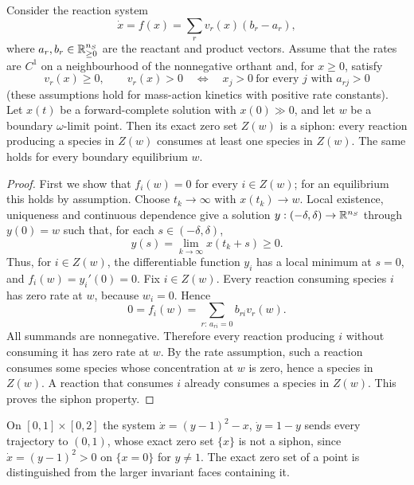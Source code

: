 \label{p:AdLS}
Consider the reaction system
\[
\dot x=f(x)=\sum_r v_r(x)(b_r-a_r),
\]
where $a_r,b_r\in\mathbb{R}_{\ge0}^{n_S}$ are the reactant and product vectors. Assume that the rates are $C^1$
on a neighbourhood of the nonnegative orthant and, for $x\ge0$, satisfy
\[
v_r(x)\ge0,\qquad
v_r(x)>0
\quad\Longleftrightarrow\quad
x_j>0\ \text{for every }j\text{ with }a_{rj}>0
\]
(these assumptions hold for mass-action kinetics with positive rate constants). Let $x(t)$ be a
forward-complete solution with $x(0)\gg0$, and let $w$ be a boundary $\omega$-limit point. Then
its exact zero set $Z(w)$ is a siphon: every reaction producing a species in $Z(w)$ consumes at
least one species in $Z(w)$. The same holds for every boundary equilibrium $w$.
\eeP
\begin{proof}
First we show that $f_i(w)=0$ for every $i\in Z(w)$; for an equilibrium this holds by assumption.
Choose $t_k\to\infty$ with $x(t_k)\to w$. Local existence, uniqueness and continuous dependence
give a solution $y:(-\delta,\delta)\to\mathbb{R}^{n_S}$ through $y(0)=w$ such that, for each
$s\in(-\delta,\delta)$,
\[
y(s)=\lim_{k\to\infty}x(t_k+s)\ge0.
\]
Thus, for $i\in Z(w)$, the differentiable function $y_i$ has a local minimum at $s=0$, and
$f_i(w)=y_i'(0)=0$.
Fix $i\in Z(w)$. Every reaction consuming species $i$ has zero rate at $w$, because $w_i=0$. Hence
\[
0=f_i(w)=\sum_{r:\,a_{ri}=0}b_{ri}v_r(w).
\]
All summands are nonnegative. Therefore every reaction producing $i$ without consuming it has zero
rate at $w$. By the rate assumption, such a reaction consumes some species whose concentration at $w$
is zero, hence a species in $Z(w)$. A reaction that consumes $i$ already consumes a species in
$Z(w)$. This proves the siphon property.
\end{proof}

 On $[0,1]\times[0,2]$ the system
$\dot x=(y-1)^2-x$, $\dot y=1-y$ sends every trajectory to $(0,1)$, whose exact zero set $\{x\}$ is not a siphon,
since $\dot x=(y-1)^2>0$ on $\{x=0\}$ for $y\ne1$. The exact zero set of a point is distinguished from the larger invariant
faces containing it.
\eeXa

